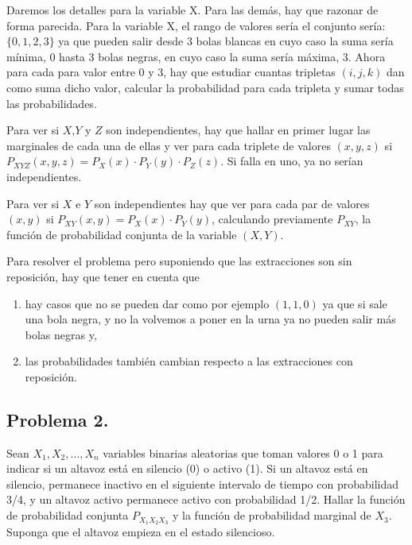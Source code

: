 \documentclass[
]{article}
\providecommand{\tightlist}{%
  \setlength{\itemsep}{0pt}\setlength{\parskip}{0pt}}
\begin{document}
Daremos los detalles para la variable X. Para las demás, hay que razonar
de forma parecida. Para la variable X, el rango de valores sería el
conjunto sería: \(\{0,1,2,3\}\) ya que pueden salir desde 3 bolas
blancas en cuyo caso la suma sería mínima, 0 hasta 3 bolas negras, en
cuyo caso la suma sería máxima, 3. Ahora para cada para valor entre 0 y
3, hay que estudiar cuantas tripletas \((i,j,k)\) dan como suma dicho
valor, calcular la probabilidad para cada tripleta y sumar todas las
probabilidades.

Para ver si \(X\),\(Y\) y \(Z\) son independientes, hay que hallar en
primer lugar las marginales de cada una de ellas y ver para cada
triplete de valores \((x,y,z)\) si
\(P_{XYZ}(x,y,z)=P_X(x)\cdot P_Y(y)\cdot P_Z(z)\). Si falla en uno, ya
no serían independientes.

Para ver si \(X\) e \(Y\) son independientes hay que ver para cada par
de valores \((x,y)\) si \(P_{XY}(x,y)=P_X(x)\cdot P_Y(y)\), calculando
previamente \(P_{X Y}\), la función de probabilidad conjunta de la
variable \((X,Y)\).

Para resolver el problema pero suponiendo que las extracciones son sin
reposición, hay que tener en cuenta que

\begin{enumerate}
\def\labelenumi{\arabic{enumi}.}
\tightlist
\item
  hay casos que no se pueden dar como por ejemplo \((1,1,0)\) ya que si
  sale una bola negra, y no la volvemos a poner en la urna ya no pueden
  salir más bolas negras y,
\item
  las probabilidades también cambian respecto a las extracciones con
  reposición.
\end{enumerate}

\hypertarget{problema-2.}{%
\subsection{Problema 2.}\label{problema-2.}}

Sean \(X_1, X_2,\ldots, X_n\) variables binarias aleatorias que toman
valores 0 o 1 para indicar si un altavoz está en silencio (0) o activo
(1). Si un altavoz está en silencio, permanece inactivo en el siguiente
intervalo de tiempo con probabilidad 3/4, y un altavoz activo permanece
activo con probabilidad 1/2. Hallar la función de probabilidad conjunta
\(P_{X_1X_2X_3}\) y la función de probabilidad marginal de \(X_3\).
Suponga que el altavoz empieza en el estado silencioso.
\end{document}
